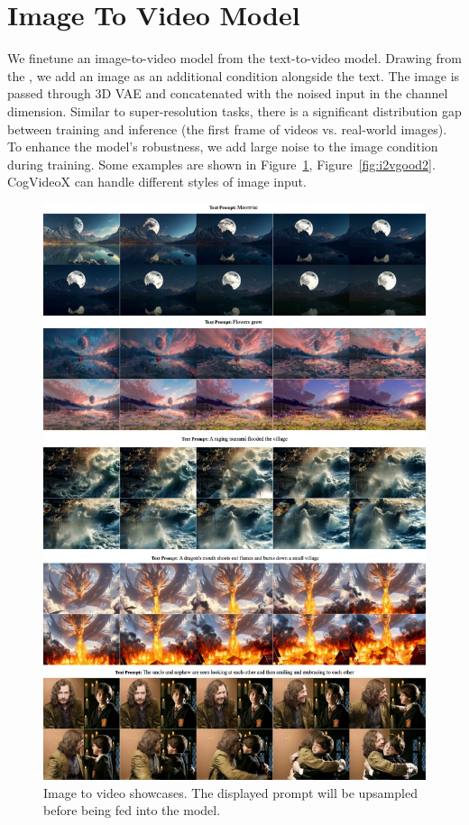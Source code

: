 \section{Image To Video Model} \label{app:i2v}
We finetune an image-to-video model from the text-to-video model. Drawing from the \citep{blattmann2023stable}, we add an image as an additional condition alongside the text. The image is passed through 3D VAE and concatenated with the noised input in the channel dimension. Similar to super-resolution tasks, there is a significant distribution gap between training and inference (the first frame of videos vs. real-world images). To enhance the model's robustness, we add large noise to the image condition during training. Some examples are shown in Figure~\ref{fig:i2vgood1}, Figure~\ref{fig:i2vgood2}. CogVideoX can handle different styles of image input.

\begin{figure}[ht]
\begin{center}
\includegraphics[width=\linewidth]{images/t2v/i2vgood1.jpg}
\end{center}
\caption{Image to video showcases. The displayed prompt will be upsampled before being fed into the model.}
\label{fig:i2vgood1}
\end{figure}

